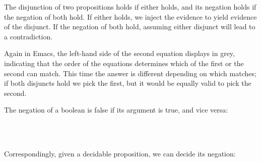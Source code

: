 The disjunction of two propositions holds if either holds, and its
negation holds if the negation of both hold. If either holds, we inject
the evidence to yield evidence of the disjunct. If the negation of both
hold, assuming either disjunct will lead to a contradiction.

Again in Emacs, the left-hand side of the second equation displays in
grey, indicating that the order of the equations determines which of the
first or the second can match. This time the answer is different
depending on which matches; if both disjuncts hold we pick the first,
but it would be equally valid to pick the second.

The negation of a boolean is false if its argument is true, and vice
versa:

\begin{fence}
\begin{code}%
\>[0]\AgdaSpace{}%
\AgdaSymbol{:}\AgdaSpace{}%
\AgdaSpace{}%
\AgdaSpace{}%
\<%
\\
\>[0]\AgdaSpace{}%
%
\>[10]\AgdaSymbol{=}\AgdaSpace{}%
\<%
\\
\>[0]\AgdaSpace{}%
\AgdaSpace{}%
\AgdaSymbol{=}\AgdaSpace{}%
\<%
\end{code}
\end{fence}

Correspondingly, given a decidable proposition, we can decide its
negation:

\begin{fence}
\begin{code}%
\>[0]\AgdaSpace{}%
\AgdaSymbol{:}\AgdaSpace{}%
\AgdaSpace{}%
\AgdaSymbol{\{}\AgdaSpace{}%
\AgdaSymbol{:}\AgdaSpace{}%
\AgdaSymbol{\}}\AgdaSpace{}%
\AgdaSpace{}%
\AgdaSpace{}%
\AgdaSpace{}%
\AgdaSpace{}%
\AgdaSpace{}%
\AgdaSymbol{(}\AgdaSpace{}%
\AgdaSymbol{)}\<%
\\
\>[0]\AgdaSpace{}%
\AgdaSymbol{(}\AgdaSpace{}%
\AgdaSymbol{)}%
\>[12]\AgdaSymbol{=}%
\>[15]\AgdaSpace{}%
\AgdaSymbol{(}\AgdaSpace{}%
\AgdaSymbol{)}\<%
\\
\>[0]\AgdaSpace{}%
\AgdaSymbol{(}\AgdaSpace{}%
\AgdaSymbol{)}%
\>[12]\AgdaSymbol{=}%
\>[15]\AgdaSpace{}%
\<%
\end{code}
\end{fence}

